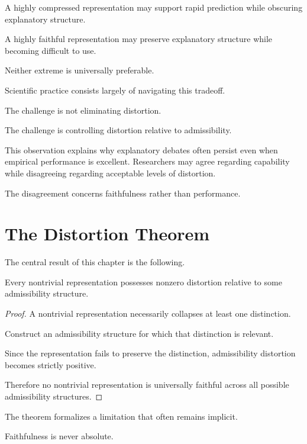 \documentclass[11pt,oneside,openany]{book}
\begin{document}
A highly compressed representation may support rapid prediction while obscuring explanatory structure.

A highly faithful representation may preserve explanatory structure while becoming difficult to use.

Neither extreme is universally preferable.

Scientific practice consists largely of navigating this tradeoff.

The challenge is not eliminating distortion.

The challenge is controlling distortion relative to admissibility.

This observation explains why explanatory debates often persist even when empirical performance is excellent. Researchers may agree regarding capability while disagreeing regarding acceptable levels of distortion.

The disagreement concerns faithfulness rather than performance.

\section{The Distortion Theorem}

The central result of this chapter is the following.

\begin{theorem}

Every nontrivial representation possesses nonzero distortion relative to some admissibility structure.

\end{theorem}

\begin{proof}

A nontrivial representation necessarily collapses at least one distinction.

Construct an admissibility structure for which that distinction is relevant.

Since the representation fails to preserve the distinction, admissibility distortion becomes strictly positive.

Therefore no nontrivial representation is universally faithful across all possible admissibility structures.

\end{proof}

The theorem formalizes a limitation that often remains implicit.

Faithfulness is never absolute.
\end{document}
